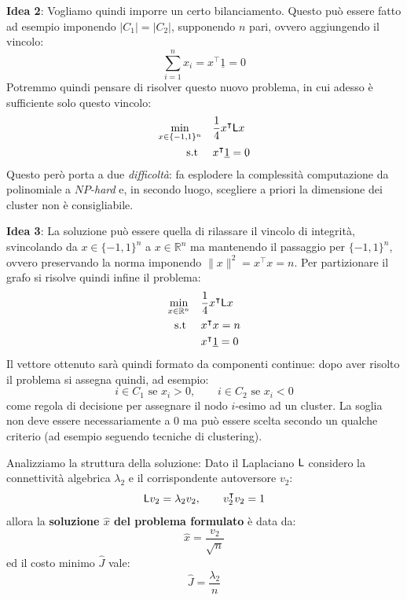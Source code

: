 \textbf{Idea 2}: Vogliamo quindi imporre un certo bilanciamento. Questo pu\`o essere fatto ad esempio imponendo $|C_1| = |C_2|$, supponendo $n$ pari, ovvero aggiungendo il vincolo:
\begin{equation}
\sum_{i=1}^n x_i = x^\intercal \underline{1} = 0
\end{equation}
Potremmo quindi pensare di risolver questo nuovo problema, in cui adesso \`e sufficiente solo questo vincolo:
\begin{align*}
\min_{x \in \{-1, 1\}^n} \quad &\frac{1}{4} x^\intercal \mathsf{L} x \\
\text{s.t } \quad &x^\intercal \underline{1} = 0
\end{align*}
Questo per\`o porta a due \textit{difficoltà}: fa esplodere la complessità computazione da polinomiale a \textit{$NP$-hard} e, in secondo luogo, scegliere a priori la dimensione dei cluster non \`e consigliabile.

\textbf{Idea 3}: La soluzione pu\`o essere quella di rilassare il vincolo di integrit\`a, svincolando da $x \in \{-1, 1\}^n$ a $x \in \mathbb{R}^n$ ma mantenendo il passaggio per $\{-1, 1\}^n$, ovvero preservando la norma imponendo $\| x \|^2 = x^\intercal x = n$. 
Per partizionare il grafo si risolve quindi infine il problema:
\begin{align*}
\min_{x \in \mathbb{R}^n} \quad &\frac{1}{4} x^\intercal \mathsf{L} x \\
\text{s.t } \quad &x^\intercal x = n \\
&x^\intercal \underline{1} = 0
\end{align*}
Il vettore ottenuto sar\`a quindi formato da componenti continue: dopo aver risolto il problema si assegna quindi, ad esempio:
\begin{equation}
i \in C_1 \text{ se } x_i > 0, \qquad i \in C_2 \text{ se } x_i < 0 
\end{equation}
come regola di decisione per assegnare il nodo $i$-esimo ad un cluster. La soglia non deve essere necessariamente a 0 ma pu\`o essere scelta secondo un qualche criterio (ad esempio seguendo tecniche di clustering). 

Analizziamo la struttura della soluzione:
Dato il Laplaciano $\mathsf{L}$ considero la connettivit\`a algebrica $\lambda_2$ e il corrispondente autoversore $v_2$:
\begin{equation}
\mathsf{L} v_2 = \lambda_2 v_2, \qquad v_2^\intercal v_2 = 1
\end{equation}
allora la \textbf{soluzione $\hat{x}$ del problema formulato} \`e data da:
\begin{equation}
\hat{x} = \frac{v_2}{\sqrt{n}}
\end{equation}
ed il costo minimo $\hat{J}$ vale:
\begin{equation}
\hat{J} = \frac{\lambda_2}{n}
\end{equation}

